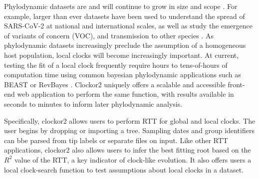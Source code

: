 \documentclass{article}
\begin{document}
Phylodynamic datasets are and will continue to grow in size and scope \cite{featherstone2022epidemiological}. For example, larger than ever datasets have been used to understand the spread of SARS-CoV-2 at national and international scales, as well as study the emergence of variants of concern (VOC), and transmission to other species \citep{du_plessis_establishment_2021,hill_origins_2022,nadeau_swiss_2023,porter2023evolutionary}. As phylodynamic datasets increasingly preclude the assumption of a homogeneous host population, local clocks will become increasingly important. At current, testing the fit of a local clock frequently require hours to tens-of-hours of computation time using common bayesian phylodynamic applications such as BEAST or RevBayes \citep{bouckaert_beast_2019, suchard_bayesian_2018, hoehna_2016_revbayes}. Clockor2 uniquely offers a scalable and accessible front-end web application to perform the same function, with results available in seconds to minutes to inform later phylodynamic analysis.

Specifically, clockor2 allows users to perform RTT for global and local clocks. The user begins by dropping or importing a tree. Sampling dates and group identifiers can bbe parsed from tip labels or separate files on input. Like other RTT applications, clockor2 also allows users to infer the best fitting root based on the $R^2$ value of the RTT, a key indicator of clock-like evolution. It also offers users a local clock-search function to test assumptions about local clocks in a dataset. 
\end{document}
